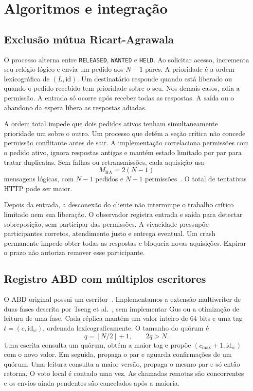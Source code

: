 \documentclass[conference]{IEEEtran}
\begin{document}
\section{Algoritmos e integração}
\subsection{Exclusão mútua Ricart-Agrawala}
O processo alterna entre \texttt{RELEASED}, \texttt{WANTED} e \texttt{HELD}. Ao solicitar acesso, incrementa seu relógio lógico e envia um pedido aos $N-1$ pares. A prioridade é a ordem lexicográfica de $(L,\mathrm{id})$. Um destinatário responde quando está liberado ou quando o pedido recebido tem prioridade sobre o seu. Nos demais casos, adia a permissão. A entrada só ocorre após receber todas as respostas. A saída ou o abandono da espera libera as respostas adiadas.

A ordem total impede que dois pedidos ativos tenham simultaneamente prioridade um sobre o outro. Um processo que detém a seção crítica não concede permissão conflitante antes de sair. A implementação correlaciona permissões com o pedido ativo, ignora respostas antigas e mantém estado limitado por par para tratar duplicatas. Sem falhas ou retransmissões, cada aquisição usa
\begin{equation}
M_{\mathrm{RA}}=2(N-1)
\end{equation}
mensagens lógicas, com $N-1$ pedidos e $N-1$ permissões~\cite{ricart}. O total de tentativas HTTP pode ser maior.

Depois da entrada, a desconexão do cliente não interrompe o trabalho crítico limitado nem sua liberação. O observador registra entrada e saída para detectar sobreposição, sem participar das permissões. A vivacidade pressupõe participantes corretos, atendimento justo e entrega eventual. Um crash permanente impede obter todas as respostas e bloqueia novas aquisições. Expirar o prazo não autoriza remover esse participante.

\subsection{Registro ABD com múltiplos escritores}
O ABD original possui um escritor~\cite{abd}. Implementamos a extensão multiwriter de duas fases descrita por Tseng et al.~\cite{mwmr}, sem implementar Gus ou a otimização de leitura de uma fase. Cada réplica mantém um valor inteiro de 64 bits e uma tag $t=(c,\mathrm{id}_w)$, ordenada lexicograficamente. O tamanho do quórum é
\begin{equation}
q=\left\lfloor N/2\right\rfloor+1,\qquad 2q>N.
\end{equation}
Uma escrita consulta um quórum, obtém a maior tag e propõe $(c_{\max}+1,\mathrm{id}_w)$ com o novo valor. Em seguida, propaga o par e aguarda confirmações de um quórum. Uma leitura consulta a maior versão, propaga o mesmo par e só então retorna. O voto local é contado uma vez. As chamadas remotas são concorrentes e os envios ainda pendentes são cancelados após a maioria.
\end{document}
